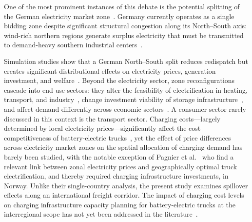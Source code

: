 \documentclass[conference]{IEEEtran}
\begin{document}
One of the most prominent instances of this debate is the potential splitting of the German electricity market zone~\cite{b_trepper2015, b_fraunholz2021, b_knorr2025, b_moretto2026}. Germany currently operates as a single bidding zone despite significant structural congestion along its North--South axis: wind-rich northern regions generate surplus electricity that must be transmitted to demand-heavy southern industrial centers~\cite{b_trepper2015, b_fraunholz2021, b_knorr2025, b_hurta2022, b_ostergaard2025, b_emelianova2025}.

Simulation studies show that a German North--South split reduces redispatch but creates significant distributional effects on electricity prices, generation investment, and welfare~\cite{b_trepper2015, b_fraunholz2021, b_knorr2025, b_moretto2026}. Beyond the electricity sector, zone reconfigurations cascade into end-use sectors: they alter the feasibility of electrification in heating, transport, and industry~\cite{b_ostergaard2025, b_emelianova2025}, change investment viability of storage infrastructure~\cite{b_hurta2022}, and affect demand differently across economic sectors~\cite{b_cho2015}.
A consumer sector rarely discussed in this context is the transport sector. Charging costs---largely determined by local electricity prices---significantly affect the cost competitiveness of battery-electric trucks~\cite{b_noll2022, b_lanz2022}, yet the effect of price differences across electricity market zones on the spatial allocation of charging demand has barely been studied, with the notable exception of Pagnier et al.~\cite{b_pagnier2026} who find a relevant link between zonal electricity prices and geographically optimal truck electrification, and thereby required charging infrastructure investments, in Norway. Unlike their single-country analysis, the present study examines spillover effects along an international freight corridor.
The impact of charging cost levels on charging infrastructure capacity planning for battery-electric trucks at the interregional scope has not yet been addressed in the literature~\cite{b_shoman2023}.

\end{document}
